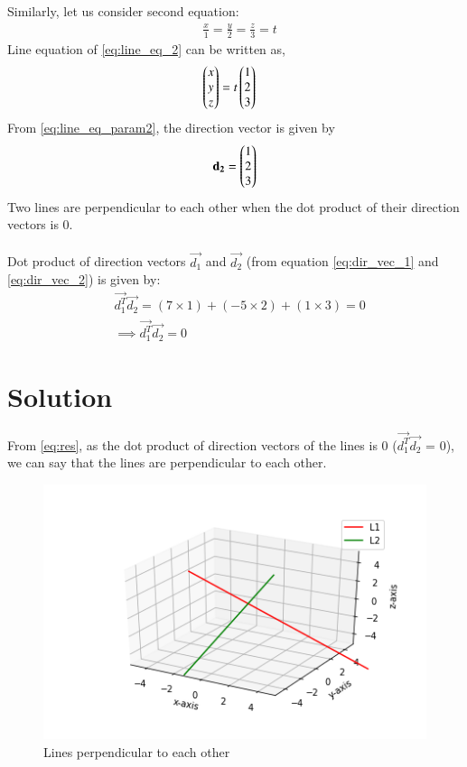\documentclass[journal,12pt,twocolumn]{IEEEtran}
\begin{document}
Similarly, let us consider second equation:
 \begin{align} \label{eq:line_eq_2}
& \frac{x}{1} = \frac{y}{2} = \frac{z}{3} = t
\end{align}
Line equation of  \ref{eq:line_eq_2} can be written as,
 \begin{align} \label{eq:line_eq_param2}
& \begin{pmatrix}x\\ y\\ z\end{pmatrix} = t \begin{pmatrix}1\\ 2\\ 3\end{pmatrix}
\end{align}
From  \ref{eq:line_eq_param2},  the direction vector is given by 
 \begin{align} \label{eq:dir_vec_2}
\mathbf{d_2} = \begin{pmatrix}1\\ 2\\ 3\end{pmatrix}
 \end{align}
Two lines are perpendicular to each other when the dot product of their direction vectors is 0.\\
\\
Dot product of direction vectors $\vec{d_1}$ and $\vec{d_2}$ (from equation \ref{eq:dir_vec_1} and \ref{eq:dir_vec_2}) is given by:\\
 \begin{align}
& \vec{d_1^T}\vec{d_2}= (7 \times 1) + (-5 \times 2) + (1 \times 3) = 0   \label{eq:dotproduct}\\
& \implies \boxed{\vec{d_1^T}\vec{d_2} = 0}  \label{eq:res}
\end{align}


\section{Solution}

From \ref{eq:res}, as the dot product of direction vectors of the lines is 0 ($\vec{d_1^T}\vec{d_2}$ = 0), we can say that the lines are perpendicular to each other.

\renewcommand{\thefigure}{\arabic{figure}}
\begin{figure}[h!]
	\centering
	\includegraphics[width=\columnwidth]{lines.png}
	\caption{Lines perpendicular to each other}
	\label{myfig}
\end{figure}\\
\\
\end{document}

